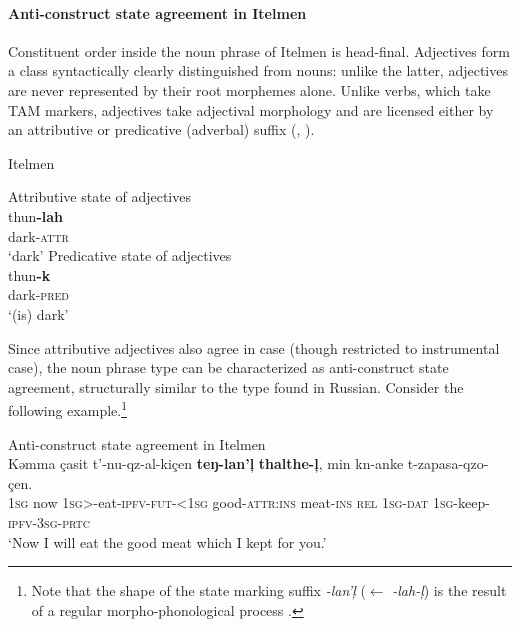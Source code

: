 \paragraph{Anti-construct state agreement in Itelmen} \label{itelmen synchr}
Constituent order inside the noun phrase of Itelmen is head-final. Adjectives form a class syntactically clearly distinguished from nouns: unlike the latter, adjectives are never represented by their root morphemes alone. Unlike verbs, which take TAM markers, adjectives take adjectival morphology and are licensed either by an attributive or predicative (adverbal) suffix (\citealt{volodin1997}, \citealt[54]{georg-etal1999}).
\begin{exe}
\ex \label{itelmen ex}
\rm{Itelmen \citep{volodin1997}} 
\begin{xlist}
\ex \rm{Attributive state of adjectives}\\
\gll	thun\textbf{-lah}\\
	dark-\textsc{attr}\\
\glt	‘dark’
\ex \rm{Predicative state of adjectives}\\
\gll	thun\textbf{-k}\\
	dark-\textsc{pred}\\
\glt	‘(is) dark’
\end{xlist}
\end{exe}
Since attributive adjectives also agree in case (though restricted to instrumental case), the noun phrase type can be characterized as anti-construct state agreement, structurally similar to the type found in Russian. Consider the following example.\footnote{Note that the shape of the state marking suffix \textit{-lan'ļ} ($\leftarrow$ \textit{-lah-ļ}) is the result of a regular morpho-phonological process \citep{georg-etal1999}.}
\begin{exe}
\ex \rm{Anti-construct state agreement in Itelmen \citep{georg-etal1999}}\\
\gll	Kəmma çasit t'-nu-qz-al-kiçen \textbf{teŋ-lan'ļ} \textbf{thalthe-ļ}, min kn-anke t-zapasa-qzo-çen.\\
	\textsc{1sg} now \textsc{1sg}>-eat-\textsc{ipfv-fut-<1sg} good-\textsc{attr:ins} meat-\textsc{ins} \textsc{rel} \textsc{1sg-dat} \textsc{1sg}-keep-\textsc{ipfv-3sg-prtc}\\
\glt	‘Now I will eat the good meat which I kept for you.’
\end{exe}

